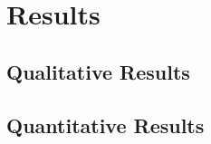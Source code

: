 \chapter{Results}
\label{ch:results}


\section{Qualitative Results}

\section{Quantitative Results}
